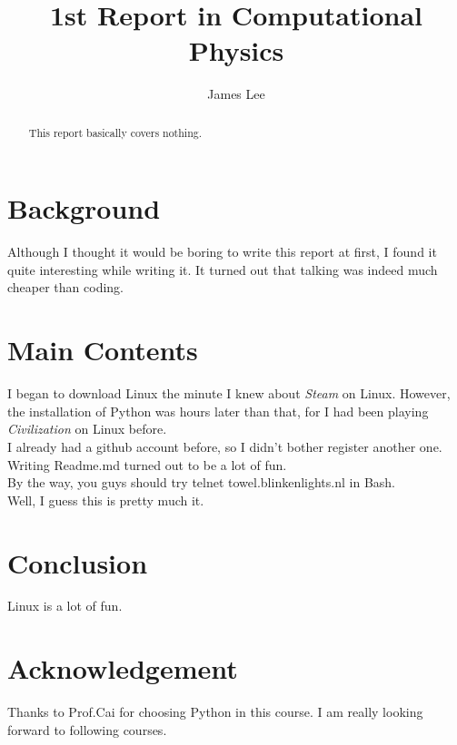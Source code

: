 \documentclass[10pt,a4paper]{article}
\author{James Lee}
\title{1st Report in Computational Physics}
\begin{document}
    \maketitle
    \begin{abstract}
    This report basically covers nothing.
    \end{abstract}
    \section{Background}
    Although I thought it would be boring to write this report at first, I found it quite interesting while writing it. It turned out that talking was indeed much cheaper than coding.
    \section{Main Contents}
    I began to download Linux the minute I knew about \emph{Steam} on Linux. However, the installation of Python was hours later than that, for I had been playing \emph{Civilization} on Linux before. \\
    I already had a github account before, so I didn't bother register another one. Writing Readme.md turned out to be a lot of fun.\\
    By the way, you guys should try telnet towel.blinkenlights.nl in Bash.\\
    Well, I guess this is pretty much it.\\ 
    \section{Conclusion}
    Linux is a lot of fun.
    \section{Acknowledgement}
    Thanks to Prof.Cai for choosing Python in this course. I am really looking forward to following courses.
\end{document}
